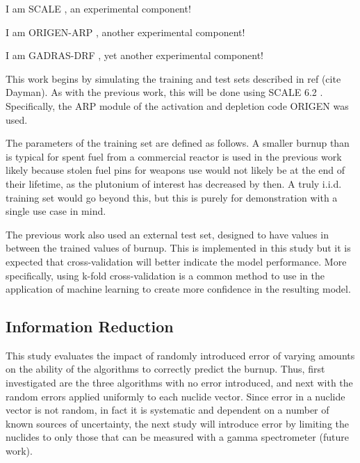 I am SCALE \cite{scale}, an experimental component!

I am \gls{ORIGEN-ARP} \cite{origen}, another experimental component!

I am \gls{GADRAS-DRF} \cite{gadras}, yet another experimental component!

This work begins by simulating the training and test sets described in ref
(cite Dayman). As with the previous work, this will be done using SCALE 6.2
. Specifically, the ARP module of the activation and depletion code
ORIGEN was used. 

The parameters of the training set are defined as follows. A smaller burnup
than is typical for spent fuel from a commercial reactor is used in the
previous work likely because stolen fuel pins for weapons use would not likely
be at the end of their lifetime, as the plutonium of interest has decreased by
then. A truly i.i.d. training set would go beyond this, but this is purely for
demonstration with a single use case in mind. 

The previous work also used an external test set, designed to have values in
between the trained values of burnup. This is implemented in this study but it
is expected that cross-validation will better indicate the model performance.
More specifically, using k-fold cross-validation is a common method to use in
the application of machine learning to create more confidence in the resulting
model. 

\subsection{Information Reduction}

This study evaluates the impact of randomly introduced error of varying amounts
on the ability of the algorithms to correctly predict the burnup. Thus, first
investigated are the three algorithms with no error introduced, and next with
the random errors applied uniformly to each nuclide vector. Since error in a
nuclide vector is not random, in fact it is systematic and dependent on a
number of known sources of uncertainty, the next study will introduce error by
limiting the nuclides to only those that can be measured with a gamma
spectrometer (future work).


